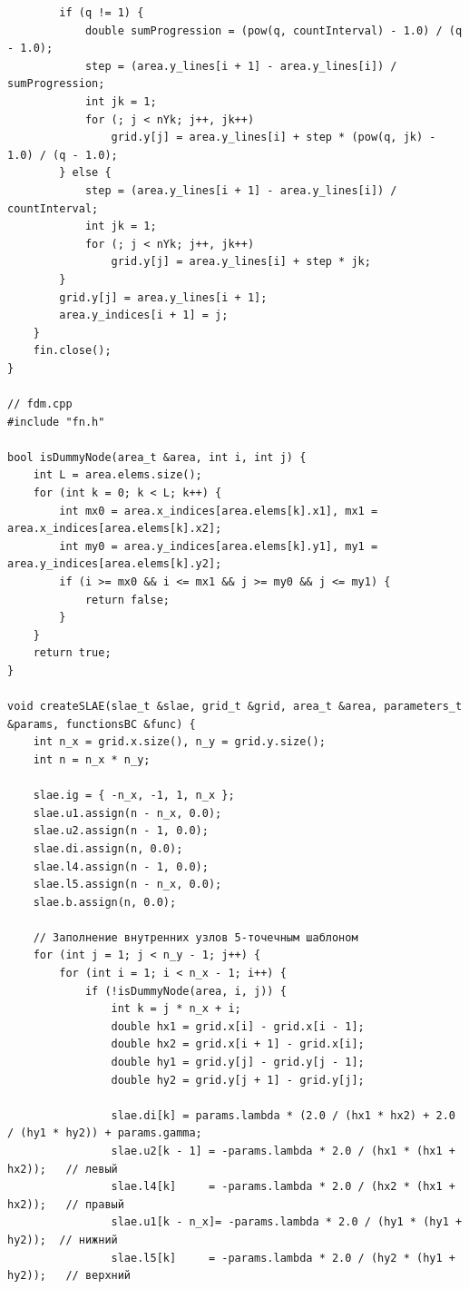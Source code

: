 \documentclass[a4paper,12pt]{article}
\begin{document}
\begin{lstlisting}
        if (q != 1) {
            double sumProgression = (pow(q, countInterval) - 1.0) / (q - 1.0);
            step = (area.y_lines[i + 1] - area.y_lines[i]) / sumProgression;
            int jk = 1;
            for (; j < nYk; j++, jk++)
                grid.y[j] = area.y_lines[i] + step * (pow(q, jk) - 1.0) / (q - 1.0);
        } else {
            step = (area.y_lines[i + 1] - area.y_lines[i]) / countInterval;
            int jk = 1;
            for (; j < nYk; j++, jk++)
                grid.y[j] = area.y_lines[i] + step * jk;
        }
        grid.y[j] = area.y_lines[i + 1];
        area.y_indices[i + 1] = j;
    }
    fin.close();
}

// fdm.cpp
#include "fn.h"

bool isDummyNode(area_t &area, int i, int j) {
    int L = area.elems.size();
    for (int k = 0; k < L; k++) {
        int mx0 = area.x_indices[area.elems[k].x1], mx1 = area.x_indices[area.elems[k].x2];
        int my0 = area.y_indices[area.elems[k].y1], my1 = area.y_indices[area.elems[k].y2];
        if (i >= mx0 && i <= mx1 && j >= my0 && j <= my1) {
            return false;
        }
    }
    return true;
}

void createSLAE(slae_t &slae, grid_t &grid, area_t &area, parameters_t &params, functionsBC &func) {
    int n_x = grid.x.size(), n_y = grid.y.size();
    int n = n_x * n_y;

    slae.ig = { -n_x, -1, 1, n_x };
    slae.u1.assign(n - n_x, 0.0);
    slae.u2.assign(n - 1, 0.0);
    slae.di.assign(n, 0.0);
    slae.l4.assign(n - 1, 0.0);
    slae.l5.assign(n - n_x, 0.0);
    slae.b.assign(n, 0.0);

    // Заполнение внутренних узлов 5-точечным шаблоном
    for (int j = 1; j < n_y - 1; j++) {
        for (int i = 1; i < n_x - 1; i++) {
            if (!isDummyNode(area, i, j)) {
                int k = j * n_x + i;
                double hx1 = grid.x[i] - grid.x[i - 1];
                double hx2 = grid.x[i + 1] - grid.x[i];
                double hy1 = grid.y[j] - grid.y[j - 1];
                double hy2 = grid.y[j + 1] - grid.y[j];

                slae.di[k] = params.lambda * (2.0 / (hx1 * hx2) + 2.0 / (hy1 * hy2)) + params.gamma;
                slae.u2[k - 1] = -params.lambda * 2.0 / (hx1 * (hx1 + hx2));   // левый
                slae.l4[k]     = -params.lambda * 2.0 / (hx2 * (hx1 + hx2));   // правый
                slae.u1[k - n_x]= -params.lambda * 2.0 / (hy1 * (hy1 + hy2));  // нижний
                slae.l5[k]     = -params.lambda * 2.0 / (hy2 * (hy1 + hy2));   // верхний
                

\end{lstlisting}
\end{document}
